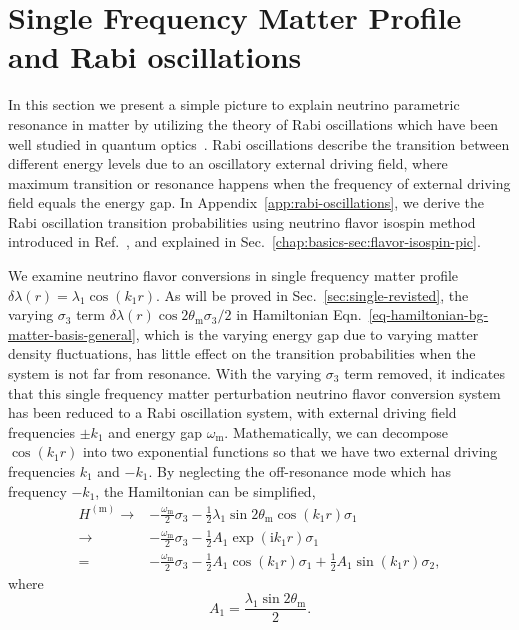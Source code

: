 \section{\label{chap:matter-sec:single}Single Frequency Matter Profile and Rabi oscillations}%


In this section we present a simple picture to explain neutrino parametric resonance in matter by utilizing the theory of Rabi oscillations which have been well studied in quantum optics~\cite{Boyd2008}. Rabi oscillations describe the transition between different energy levels due to an oscillatory external driving field, where maximum transition or resonance happens when the frequency of external driving field equals the energy gap. In Appendix~\ref{app:rabi-oscillations}, we derive the Rabi oscillation transition probabilities using neutrino flavor isospin method introduced in Ref.~\cite{Duan2006a}, and explained in Sec.~\ref{chap:basics-sec:flavor-isospin-pic}.






We examine neutrino flavor conversions in single frequency matter profile $\delta\lambda(r) = \lambda_1 \cos(k_1 r)$. As will be proved in Sec.~\ref{sec:single-revisted}, the varying $\sigma_3$ term $\delta\lambda(r) \cos 2\theta_{\mathrm m} \sigma_3/2$ in Hamiltonian Eqn.~\ref{eq-hamiltonian-bg-matter-basis-general}, which is the varying energy gap due to varying matter density fluctuations, has little effect on the transition probabilities when the system is not far from resonance. With the varying $\sigma_3$ term removed, it indicates that this single frequency matter perturbation neutrino flavor conversion system has been reduced to a Rabi oscillation system, with external driving field frequencies $\pm k_1$ and energy gap $\omega_{\mathrm m}$. Mathematically, we can decompose $\cos( k_1 r )$ into two exponential functions so that we have two external driving frequencies $k_1$ and $-k_1$. By neglecting the off-resonance mode which has frequency $-k_1$, the Hamiltonian can be simplified,
\begin{align}
H^{(\mathrm{m})} \to & -\frac{\omega_{\mathrm m}}{2} \sigma_3  - \frac{1}{2} \lambda_1 \sin 2\theta_{\mathrm m} \cos( k_1 r ) \sigma_1\label{eq-hamiltonian-bg-matter-basis-single-frequency} \\
\to & -\frac{\omega_{\mathrm m}}{2} \sigma_3  - \frac{1}{2} A_1 \exp (\mathrm ik_1 r) \sigma_1 \nonumber \\
= & -\frac{\omega_{\mathrm m}}{2} \sigma_3  - \frac{1}{2} A_1 \cos ( k_1 r)  \sigma_1 + \frac{1}{2} A_1\sin(k_1 r) \sigma_2,\nonumber
\end{align}
where
\begin{equation}
A_1 = \frac{\lambda_1 \sin 2\theta_{\mathrm m} }{2}.
\label{eq-define-a1}
\end{equation}

